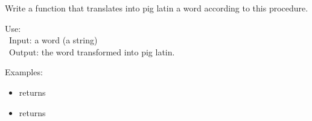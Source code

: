 \documentclass[11pt,class=report,crop=false]{standalone}
\begin{document}
\begin{activite}
\begin{enumerate}
\begin{itemize}
   
 \end{itemize}
 
  Write a function  that translates into pig latin a word according to this procedure.
  
  \begin{fonction}
  Use:  \\\
  Input: a word (a string) \\\
  Output: the word transformed into pig latin.
  
  \medskip
    
  Examples: 
  \begin{itemize}
    \item {} returns 
    \item {} returns 
  \end{itemize}    
  \end{fonction} 
  

\end{enumerate} 

\end{activite}


\end{document}
